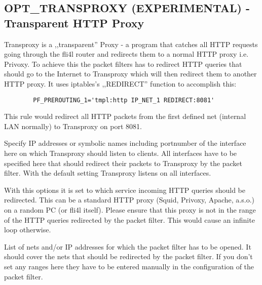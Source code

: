 \subsection{OPT\_TRANSPROXY (EXPERIMENTAL) - Transparent HTTP Proxy}

Transproxy is a ,,transparent'' Proxy - a program that catches all HTTP
requests going through the fli4l router and redirects them to a normal HTTP
proxy i.e. Privoxy. To achieve this the packet filters has to redirect HTTP
queries that should go to the Internet to Transproxy which will then redirect
them to another HTTP proxy. It uses iptables's ,,REDIRECT'' function to
accomplish this:

\begin{verbatim}
        PF_PREROUTING_1='tmpl:http IP_NET_1 REDIRECT:8081'
\end{verbatim}

This rule would redirect all HTTP packets from the first defined net (internal
LAN normally) to Transproxy on port 8081.

\begin{description}


        {Specify IP addresses or symbolic names including portnumber of
        the interface here on which Transproxy should listen to clients.
        All interfaces have to be specified here that should redirect
        their packets to Transproxy by the packet filter. With the default
        setting  Transproxy listens on all interfaces.}


        {With this options it is set to which service incoming HTTP queries should
        be redirected. This can be a standard HTTP proxy (Squid, Privoxy, Apache, a.s.o.)
        on a random PC (or fli4l itself). Please ensure that this proxy is not in the
        range of the HTTP queries redirected by the packet filter. This would
        cause an infinite loop otherwise.}


        {List of nets and/or IP addresses for which the packet filter
        has to be opened. It should cover the nets that should be redirected
        by the packet filter. If you don't set any ranges here they have to
        be entered manually in the configuration of the packet filter.}

\end{description}
